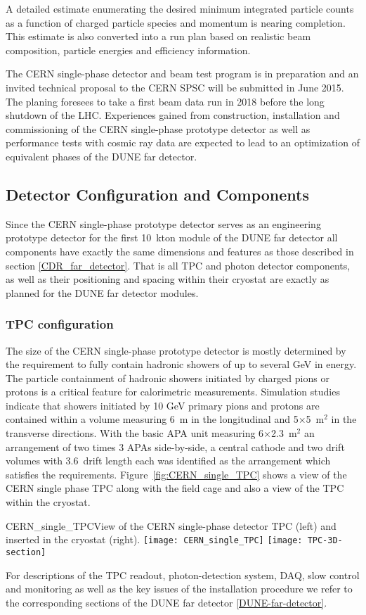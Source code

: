 A detailed estimate enumerating the desired minimum integrated particle counts as a function
of charged particle species and momentum is nearing completion. This estimate is also converted 
into a run plan based on realistic beam composition, particle energies and efficiency information. 

The CERN single-phase detector and beam test program is in preparation and an invited technical proposal 
\cite{CERN_single-phase_proposal} to the CERN SPSC will be submitted in June 2015. The planing foresees to 
take a first beam data run in 2018 before the long shutdown of the LHC. Experiences gained from construction, installation and commissioning of the CERN single-phase prototype detector as well as performance tests with 
cosmic ray data are expected to lead to an optimization of equivalent phases of the DUNE far detector. 

\subsection{Detector Configuration and Components}

Since the CERN single-phase prototype detector serves as an engineering prototype detector for the 
first 10~kton module of the DUNE far detector all components have exactly the same dimensions
and features as those described in section \ref{CDR_far_detector}. That is all TPC and photon detector components, 
as well as their positioning and spacing within their cryostat are exactly as planned for the DUNE far detector modules.

\subsubsection{TPC configuration}

The size of the CERN single-phase prototype detector is mostly determined by the requirement to fully contain hadronic showers of up to several GeV in energy.
The particle containment of hadronic showers initiated by charged pions or protons
is a critical feature for calorimetric measurements. Simulation studies indicate that showers initiated by 10 GeV
primary pions and protons are contained within a volume measuring 6~m in the longitudinal and 5$\times$5~m$^2$
in the transverse directions. With the basic APA unit measuring 6$\times$2.3~m$^2$ an arrangement of two times 
3 APAs  side-by-side, a central cathode and two drift volumes with 3.6~drift length each was identified as the arrangement which satisfies the requirements. Figure~\ref{fig:CERN_single_TPC} shows a view of the CERN single phase TPC along with the field cage and also a view of the TPC within the cryostat.
%
\begin{cdrfigure}{CERN_single_TPC}{View of the CERN single-phase detector TPC (left) and inserted in the cryostat (right). }
\texttt{[image: CERN\_single\_TPC]}
\texttt{[image: TPC-3D-section]}
\end{cdrfigure}
%
For descriptions of the TPC readout, photon-detection system, DAQ, slow control and monitoring as well as 
the key issues of the installation procedure we refer to the corresponding sections of the DUNE far 
detector \ref{DUNE-far-detector}.

